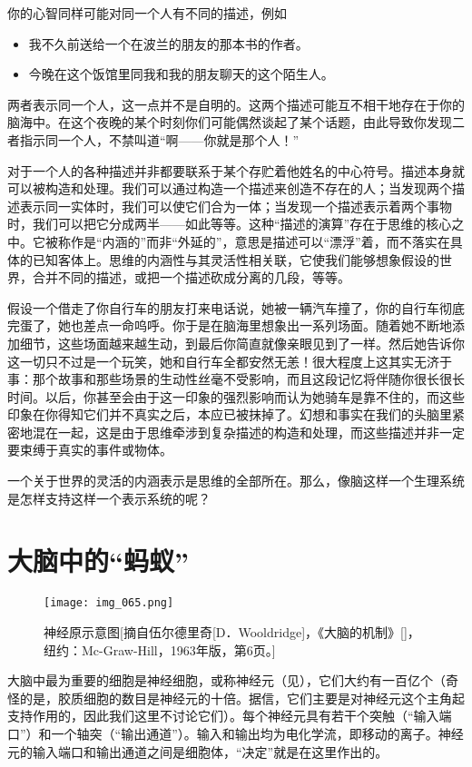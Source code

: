 你的心智同样可能对同一个人有不同的描述，例如
\begin{itemize}
\item 我不久前送给一个在波兰的朋友的那本书的作者。
\item 今晚在这个饭馆里同我和我的朋友聊天的这个陌生人。
\end{itemize}
两者表示同一个人，这一点并不是自明的。这两个描述可能互不相干地存在于你的脑海中。在这个夜晚的某个时刻你们可能偶然谈起了某个话题，由此导致你发现二者指示同一个人，不禁叫道“啊——你就是那个人！”

对于一个人的各种描述并非都要联系于某个存贮着他姓名的中心符号。描述本身就可以被构造和处理。我们可以通过构造一个描述来创造不存在的人；当发现两个描述表示同一实体时，我们可以使它们合为一体；当发现一个描述表示着两个事物时，我们可以把它分成两半——如此等等。这种“描述的演算”存在于思维的核心之中。它被称作是“内涵的”而非“外延的”，意思是描述可以“漂浮”着，而不落实在具体的已知客体上。思维的内涵性与其灵活性相关联，它使我们能够想象假设的世界，合并不同的描述，或把一个描述砍成分离的几段，等等。

假设一个借走了你自行车的朋友打来电话说，她被一辆汽车撞了，你的自行车彻底完蛋了，她也差点一命呜呼。你于是在脑海里想象出一系列场面。随着她不断地添加细节，这些场面越来越生动，到最后你简直就像亲眼见到了一样。然后她告诉你这一切只不过是一个玩笑，她和自行车全都安然无恙！很大程度上这其实无济于事：那个故事和那些场景的生动性丝毫不受影响，而且这段记忆将伴随你很长很长时间。以后，你甚至会由于这一印象的强烈影响而认为她骑车是靠不住的，而这些印象在你得知它们并不真实之后，本应已被抹掉了。幻想和事实在我们的头脑里紧密地混在一起，这是由于思维牵涉到复杂描述的构造和处理，而这些描述并非一定要束缚于真实的事件或物体。

一个关于世界的灵活的内涵表示是思维的全部所在。那么，像脑这样一个生理系统是怎样支持这样一个表示系统的呢？

\section{大脑中的“蚂蚁”}

\begin{figure}
\texttt{[image: img\_065.png]}
\caption[神经元示意图。]
  {神经原示意图[摘自伍尔德里奇[D．Wooldridge]，《大脑的机制》[]，纽约：Mc-Graw-Hill，1963年版，第6页。] }
\end{figure}

大脑中最为重要的细胞是神经细胞，或称神经元（见），它们大约有一百亿个（奇怪的是，胶质细胞的数目是神经元的十倍。据信，它们主要是对神经元这个主角起支持作用的，因此我们这里不讨论它们）。每个神经元具有若干个突触（“输入端口”）和一个轴突（“输出通道”）。输入和输出均为电化学流，即移动的离子。神经元的输入端口和输出通道之间是细胞体，“决定”就是在这里作出的。

